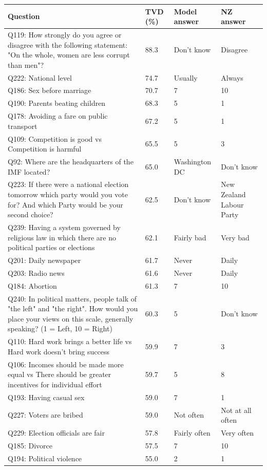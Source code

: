\begin{tabular}{p{3.1in}lp{1.05in}p{1.05in}}
\toprule
Question & TVD (\%) & Model answer & NZ answer \\
\midrule
Q119: How strongly do you agree or disagree with the following statement: "On the whole, women are less corrupt than men"? & 88.3 & Don't know & Disagree \\
Q222: National level & 74.7 & Usually & Always \\
Q186: Sex before marriage & 70.7 & 7 & 10 \\
Q190: Parents beating children & 68.3 & 5 & 1 \\
Q178: Avoiding a fare on public transport & 67.2 & 5 & 1 \\
Q109: Competition is good vs Competition is harmful & 65.5 & 5 & 3 \\
Q92: Where are the headquarters of the IMF located? & 65.0 & Washington DC & Don't know \\
Q223: If there were a national election tomorrow which party would you vote for? And which Party would be your second choice? & 62.5 & Don't know & New Zealand Labour Party \\
Q239: Having a system governed by religious law in which there are no political parties or elections & 62.1 & Fairly bad & Very bad \\
Q201: Daily newspaper & 61.7 & Never & Daily \\
Q203: Radio news & 61.6 & Never & Daily \\
Q184: Abortion & 61.3 & 7 & 10 \\
Q240: In political matters, people talk of "the left" and "the right". How would you place your views on this scale, generally speaking? (1 = Left, 10 = Right) & 60.3 & 5 & Don't know \\
Q110: Hard work brings a better life vs Hard work doesn't bring success & 59.9 & 7 & 3 \\
Q106: Incomes should be made more equal vs There should be greater incentives for individual effort & 59.7 & 5 & 8 \\
Q193: Having casual sex & 59.0 & 7 & 1 \\
Q227: Voters are bribed & 59.0 & Not often & Not at all often \\
Q229: Election officials are fair & 57.8 & Fairly often & Very often \\
Q185: Divorce & 57.5 & 7 & 10 \\
Q194: Political violence & 55.0 & 2 & 1 \\

\end{tabular}
